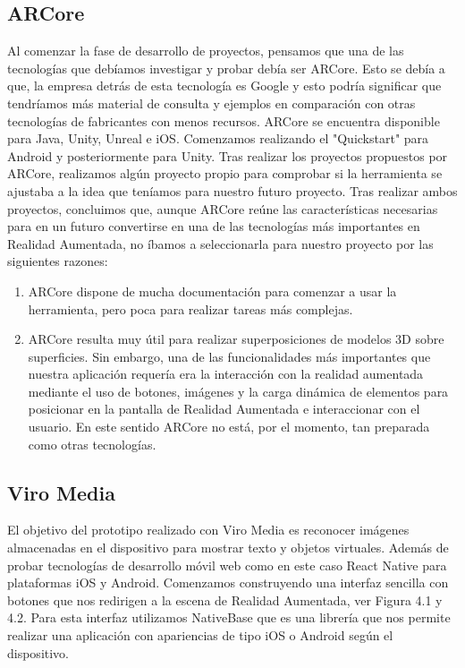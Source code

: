 \subsection{ARCore} 
\label{makereference3.6.1} 
    Al comenzar la fase de desarrollo de proyectos, pensamos que una de las tecnologías que debíamos 
    investigar y probar debía ser ARCore. Esto se debía a que, la empresa detrás de esta 
    tecnología es Google y esto podría significar que tendríamos más material de consulta 
    y ejemplos en comparación con otras tecnologías de fabricantes con menos recursos.
    ARCore se encuentra disponible para Java, Unity, Unreal e iOS. Comenzamos realizando el 
    "Quickstart" para Android y posteriormente para Unity. 
    Tras realizar los proyectos propuestos por ARCore, realizamos algún proyecto propio 
    para comprobar si la herramienta se ajustaba a la idea que teníamos para nuestro futuro proyecto.
    Tras realizar ambos proyectos, concluimos que, aunque ARCore reúne las características 
    necesarias para en un futuro convertirse en una de las tecnologías más importantes en Realidad Aumentada, 
    no íbamos a seleccionarla para nuestro proyecto por las siguientes razones:
    \begin{enumerate}
        \item ARCore dispone de mucha documentación para comenzar a usar la herramienta, pero poca para realizar tareas más complejas.
        \item ARCore resulta muy útil para realizar superposiciones de modelos 3D sobre superficies. Sin embargo, una de las funcionalidades más importantes que nuestra aplicación requería era la interacción con la realidad aumentada mediante el uso de botones, imágenes y la carga dinámica de elementos para posicionar en la pantalla de Realidad Aumentada e interaccionar con el usuario. En este sentido ARCore no está, por el momento, tan preparada como otras tecnologías.
    \end{enumerate}
\subsection{Viro Media} 
\label{makereference3.6.2}

El objetivo del prototipo realizado con Viro Media es reconocer imágenes almacenadas en el dispositivo para mostrar texto y
objetos virtuales. Además de probar tecnologías de desarrollo móvil web como en este caso React Native
para plataformas iOS y Android. Comenzamos construyendo una interfaz sencilla con botones que nos redirigen a la escena de Realidad Aumentada, ver Figura 4.1 y 4.2.
Para esta interfaz utilizamos NativeBase que es una librería que nos permite
realizar una aplicación con apariencias de tipo iOS o Android según el dispositivo.

